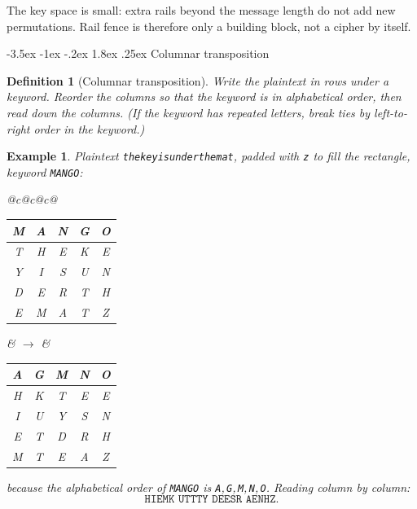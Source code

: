 \documentclass[11pt]{article}
\makeatletter
\renewcommand{\subsection}{\@startsection{subsection}{2}{\z@}%
    {-3.5ex \@plus -1ex \@minus -.2ex}%
    {1.8ex \@plus .25ex}%
    {\normalfont\large\bfseries}}
\newtheorem{definition}[theorem]{Definition}
\newtheorem{example}[theorem]{Example}
\theoremstyle{remark}
\makeatother
\begin{document}
The key space is small: extra rails beyond the message length do not add
new permutations. Rail fence is therefore only a building block, not a
cipher by itself.

\subsection{Columnar transposition}

\begin{definition}[Columnar transposition]
Write the plaintext in rows under a keyword. Reorder the columns so that
the keyword is in alphabetical order, then read down the columns. (If the keyword has repeated letters, break
ties by left-to-right order in the keyword.)
\end{definition}

\begin{example}
Plaintext \texttt{thekeyisunderthemat}, padded with \texttt{z} to fill
the rectangle, keyword \texttt{MANGO}:
\begin{center}
\renewcommand{\arraystretch}{1.2}
\begin{tabular}{@{}c@{\qquad}c@{\qquad}c@{}}
\begin{tabular}{|c|c|c|c|c|}
\hline
M & A & N & G & O \\
\hline
T & H & E & K & E \\
Y & I & S & U & N \\
D & E & R & T & H \\
E & M & A & T & Z \\
\hline
\end{tabular}
&
$\longrightarrow$
&
\begin{tabular}{|c|c|c|c|c|}
\hline
A & G & M & N & O \\
\hline
H & K & T & E & E \\
I & U & Y & S & N \\
E & T & D & R & H \\
M & T & E & A & Z \\
\hline
\end{tabular}
\end{tabular}
\end{center}
because the alphabetical order of \texttt{MANGO} is
\texttt{A},\,\texttt{G},\,\texttt{M},\,\texttt{N},\,\texttt{O}.
Reading column by column:
\[
    \texttt{HIEMK UTTTY DEESR AENHZ}.
\]
\end{example}
\end{document}
